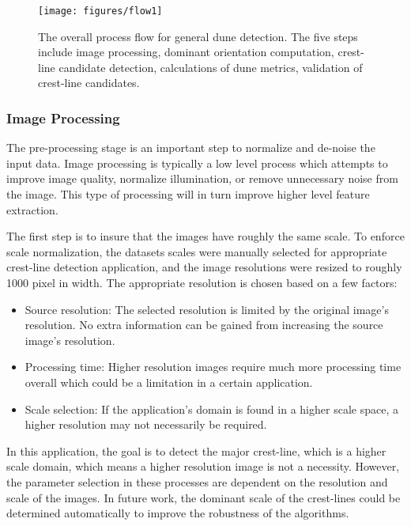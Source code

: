  \begin{figure}[H]
 	\centering
 	\texttt{[image: figures/flow1]}
 	\caption{The overall process flow for general dune detection. The five steps include image processing, dominant orientation computation, crest-line candidate detection, calculations of dune metrics, validation of crest-line candidates.}
 	\label{fig:main_flow}
 \end{figure}

\subsubsection*{Image Processing}

The pre-processing stage is an important step to normalize and de-noise the input data. Image processing is typically a low level process which attempts to improve image quality, normalize illumination, or remove unnecessary noise from the image. This type of processing will in turn improve higher level feature extraction.

The first step is to insure that the images have roughly the same scale. To enforce scale normalization, the datasets scales were manually selected for appropriate crest-line detection application, and the image resolutions were resized to roughly 1000 pixel in width. The appropriate resolution is chosen based on a few factors:

\begin{itemize}
	\item Source resolution: The selected resolution is limited by the original image's resolution. No extra information can be gained from increasing the source image's resolution.
	\item Processing time: Higher resolution images require much more processing time overall which could be a limitation in a certain application.
	\item Scale selection: If the application's domain is found in a higher scale space, a higher resolution may not necessarily be required.
\end{itemize}

In this application, the goal is to detect the major crest-line, which is a higher scale domain, which means a higher resolution image is not a necessity. However, the parameter selection in these processes are dependent on the resolution and scale of the images. In future work, the dominant scale of the crest-lines could be determined automatically to improve the robustness of the algorithms.

